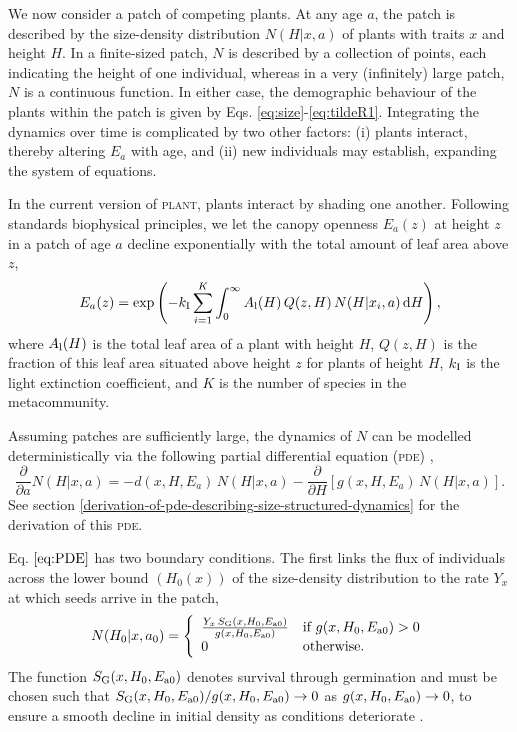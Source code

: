 \documentclass[10pt,twoside]{article}
\newcommand{\plant}{\textsc{plant}}
\begin{document}
We now consider a patch of competing plants. At any age \(a\), the
patch is described by the size-density distribution \(N(H | x, a)\) of plants
with traits \(x\) and height \(H\). In a finite-sized patch, \(N\) is described by a
collection of points, each indicating the height of one individual, whereas in a very (infinitely) large patch,
\(N\) is a continuous function. In either case, the demographic
behaviour of the plants within the patch is given by Eqs. \ref{eq:size}-\ref{eq:tildeR1}. Integrating the dynamics over time is complicated by
two other factors: (i) plants interact, thereby altering \(E_a\) with
age, and (ii) new individuals may establish, expanding the system of
equations.

In the current version of {\plant}, plants interact by shading one another.
Following standards biophysical principles, we let the canopy openness
\(E_a(z)\) at height \(z\) in a patch of age \(a\) decline exponentially
with the total amount of leaf area above \(z\),
\begin{equation} \label{eq:light}
E_a(z) = \exp \left(-k_{\rm I} \sum_{i = 1}^{K} \int_{0}^{\infty} A_{\rm l}(H) \, Q(z, H) \, N(H | x_i, a) \, {\rm d}H \right),
\end{equation}
where \(A_{\rm l}(H)\) is the total leaf area of a plant with height $H$, \(Q(z, H)\) is the fraction of
this leaf area situated above height \(z\) for plants of height \(H\),
\(k_{\rm I}\) is the light extinction coefficient, and \(K\) is the number
of species in the metacommunity.

Assuming patches are sufficiently large, the dynamics of \(N\) can be modelled
deterministically via the following partial differential equation (\textsc{pde})
\citep{Kohyama-1993, Deroos-1997, Moorcroft-2001},
\begin{equation} \label{eq:PDE}
\frac{\partial}{\partial a} N(H | x, a) = - d(x, H, E_a) \, N(H | x, a) - \frac{\partial}{\partial H} \left[g(x, H, E_a) \, N(H | x, a)\right].
\end{equation}
See section \ref{derivation-of-pde-describing-size-structured-dynamics} for the derivation of this \textsc{pde}.

Eq. \(\ref{eq:PDE}\) has two boundary conditions. The first links the
flux of individuals across the lower bound \((H_0(x))\) of the size-density
distribution to the rate \(Y_{x}\) at which seeds arrive in the patch,
\begin{equation} \label{eq:BC1}
N(H_0 | x, a_0) = \left\{
\begin{array}{ll} \frac{Y_{x} \, S_{\rm G} (x, H_0, E_{{\rm a}0}) }{ g(x, H_0, E_{{\rm a}0}) } & \textrm{if } g(x, H_0, E_{{\rm a}0}) > 0 \\
0 & \textrm{otherwise.}
\end{array} \right.
\end{equation}
The function \(S_{\rm G} (x, H_0, E_{{\rm a}0})\) denotes survival through
germination and must be chosen such that
\(S_{\rm G} (x, H_0, E_{{\rm a}0}) / g(x, H_0, E_{{\rm a}0}) \rightarrow 0\) as
\(g(x, H_0, E_{{\rm a}0}) \rightarrow 0\), to ensure a smooth decline in
initial density as conditions deteriorate \citep{Falster-2011}.
\end{document}
